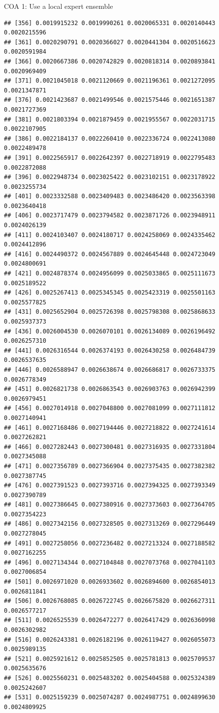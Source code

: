 \documentclass[ignorenonframetext,]{beamer}
\begin{document}
\begin{frame}[fragile]{COA 1: Use a local expert ensemble}
\begin{verbatim}
## [356] 0.0019915232 0.0019990261 0.0020065331 0.0020140443 0.0020215596
## [361] 0.0020290791 0.0020366027 0.0020441304 0.0020516623 0.0020591984
## [366] 0.0020667386 0.0020742829 0.0020818314 0.0020893841 0.0020969409
## [371] 0.0021045018 0.0021120669 0.0021196361 0.0021272095 0.0021347871
## [376] 0.0021423687 0.0021499546 0.0021575446 0.0021651387 0.0021727369
## [381] 0.0021803394 0.0021879459 0.0021955567 0.0022031715 0.0022107905
## [386] 0.0022184137 0.0022260410 0.0022336724 0.0022413080 0.0022489478
## [391] 0.0022565917 0.0022642397 0.0022718919 0.0022795483 0.0022872088
## [396] 0.0022948734 0.0023025422 0.0023102151 0.0023178922 0.0023255734
## [401] 0.0023332588 0.0023409483 0.0023486420 0.0023563398 0.0023640418
## [406] 0.0023717479 0.0023794582 0.0023871726 0.0023948911 0.0024026139
## [411] 0.0024103407 0.0024180717 0.0024258069 0.0024335462 0.0024412896
## [416] 0.0024490372 0.0024567889 0.0024645448 0.0024723049 0.0024800691
## [421] 0.0024878374 0.0024956099 0.0025033865 0.0025111673 0.0025189522
## [426] 0.0025267413 0.0025345345 0.0025423319 0.0025501163 0.0025577825
## [431] 0.0025652904 0.0025726398 0.0025798308 0.0025868633 0.0025937373
## [436] 0.0026004530 0.0026070101 0.0026134089 0.0026196492 0.0026257310
## [441] 0.0026316544 0.0026374193 0.0026430258 0.0026484739 0.0026537635
## [446] 0.0026588947 0.0026638674 0.0026686817 0.0026733375 0.0026778349
## [451] 0.0026821738 0.0026863543 0.0026903763 0.0026942399 0.0026979451
## [456] 0.0027014918 0.0027048800 0.0027081099 0.0027111812 0.0027140941
## [461] 0.0027168486 0.0027194446 0.0027218822 0.0027241614 0.0027262821
## [466] 0.0027282443 0.0027300481 0.0027316935 0.0027331804 0.0027345088
## [471] 0.0027356789 0.0027366904 0.0027375435 0.0027382382 0.0027387745
## [476] 0.0027391523 0.0027393716 0.0027394325 0.0027393349 0.0027390789
## [481] 0.0027386645 0.0027380916 0.0027373603 0.0027364705 0.0027354223
## [486] 0.0027342156 0.0027328505 0.0027313269 0.0027296449 0.0027278045
## [491] 0.0027258056 0.0027236482 0.0027213324 0.0027188582 0.0027162255
## [496] 0.0027134344 0.0027104848 0.0027073768 0.0027041103 0.0027006854
## [501] 0.0026971020 0.0026933602 0.0026894600 0.0026854013 0.0026811841
## [506] 0.0026768085 0.0026722745 0.0026675820 0.0026627311 0.0026577217
## [511] 0.0026525539 0.0026472277 0.0026417429 0.0026360998 0.0026302982
## [516] 0.0026243381 0.0026182196 0.0026119427 0.0026055073 0.0025989135
## [521] 0.0025921612 0.0025852505 0.0025781813 0.0025709537 0.0025635676
## [526] 0.0025560231 0.0025483202 0.0025404588 0.0025324389 0.0025242607
## [531] 0.0025159239 0.0025074287 0.0024987751 0.0024899630 0.0024809925

\end{verbatim}
\end{frame}
\end{document}
